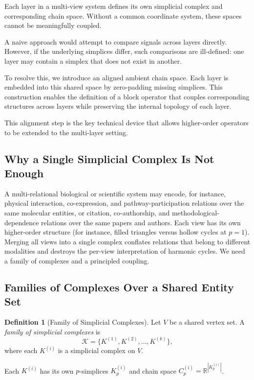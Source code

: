 \documentclass[11pt]{article}
\theoremstyle{definition}
\newtheorem{definition}[theorem]{Definition}
\theoremstyle{remark}
\newcommand{\R}{\mathbb{R}}
\newcommand{\calK}{\mathcal{K}}
\begin{document}
Each layer in a multi-view system defines its own simplicial complex and corresponding chain space. Without a common coordinate system, these spaces cannot be meaningfully coupled.

A naive approach would attempt to compare signals across layers directly. However, if the underlying simplices differ, such comparisons are ill-defined: one layer may contain a simplex that does not exist in another.

To resolve this, we introduce an aligned ambient chain space. Each layer is embedded into this shared space by zero-padding missing simplices. This construction enables the definition of a block operator that couples corresponding structures across layers while preserving the internal topology of each layer.

This alignment step is the key technical device that allows higher-order operators to be extended to the multi-layer setting.

\subsection{Why a Single Simplicial Complex Is Not Enough}

A multi-relational biological or scientific system may encode, for instance, physical interaction, co-expression, and pathway-participation relations over the same molecular entities, or citation, co-authorship, and methodological-dependence relations over the same papers and authors. Each view has its own higher-order structure (for instance, filled triangles versus hollow cycles at $p=1$). Merging all views into a single complex conflates relations that belong to different modalities and destroys the per-view interpretation of harmonic cycles. We need a family of complexes and a principled coupling.

\subsection{Families of Complexes Over a Shared Entity Set}

\begin{definition}[Family of Simplicial Complexes]
Let $V$ be a shared vertex set. A \emph{family of simplicial complexes} is
\[
  \calK = \{K^{(1)}, K^{(2)}, \dots, K^{(k)}\},
\]
where each $K^{(i)}$ is a simplicial complex on $V$.
\end{definition}

Each $K^{(i)}$ has its own $p$-simplices $K_p^{(i)}$ and chain space
$C_p^{(i)} = \R^{|K_p^{(i)}|}$.
\end{document}
